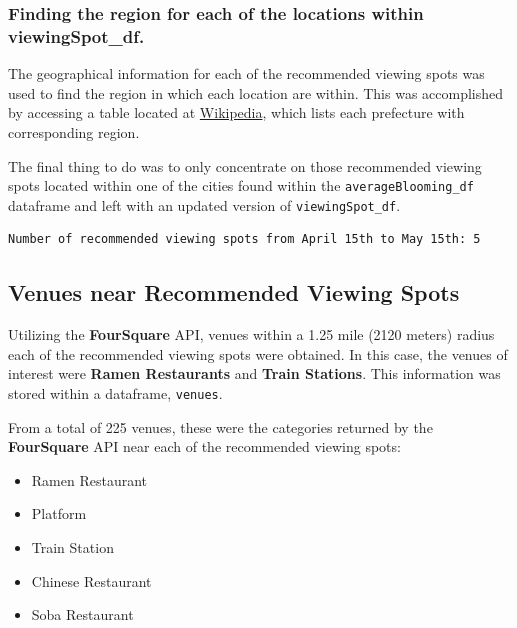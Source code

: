 \documentclass[11pt]{article}
\providecommand{\tightlist}{%
      \setlength{\itemsep}{0pt}\setlength{\parskip}{0pt}}
\begin{document}
    \hypertarget{finding-the-region-for-each-of-the-locations-within-viewingspot_df.}{%
\subsubsection{Finding the region for each of the locations within viewingSpot\_df.}\label{finding-the-region-for-each-of-the-locations-within-viewingspot_df}}

The geographical information for each of the recommended viewing spots was used to find the region in which each location are within. 
This was accomplished by accessing a table located at \href{https://simple.wikipedia.org/wiki/Prefectures_of_Japan}{Wikipedia},
which lists each prefecture with corresponding region.

The final thing to do was to only concentrate on those recommended viewing spots located within one of the cities found within the 
\texttt{averageBlooming\_df} dataframe and left with an updated version of \texttt{viewingSpot\_df}.



\begin{Verbatim}[commandchars=\\\{\}]
  Number of recommended viewing spots from April 15th to May 15th: 5
      \end{Verbatim}
  
    \hypertarget{Venues-near-recommended-viewing-spots}{%
\subsection{Venues near Recommended Viewing Spots}\label{Venues-near-recommended-viewing-spots}}

Utilizing the \textbf{FourSquare} API, venues within a 1.25 mile (2120 meters) radius each of the recommended viewing spots were obtained.
In this case, the venues of interest were \textbf{Ramen Restaurants} and \textbf{Train Stations}. This information was stored within a dataframe,
\texttt{venues}.



From a total of 225 venues, these were the categories returned by the \textbf{FourSquare} API near each of the recommended viewing spots:

\begin{itemize}
\tightlist
  \item Ramen Restaurant
  \item Platform
  \item Train Station
  \item Chinese Restaurant
  \item Soba Restaurant
\end{itemize}
\end{document}
